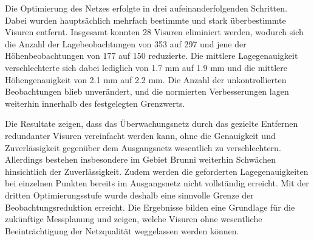 Die Optimierung des Netzes erfolgte in drei aufeinanderfolgenden Schritten.
Dabei wurden hauptsächlich mehrfach bestimmte und stark überbestimmte Visuren
entfernt. Insgesamt konnten 28 Visuren eliminiert werden, wodurch sich die
Anzahl der Lagebeobachtungen von 353 auf 297 und jene der Höhenbeobachtungen
von 177 auf 150 reduzierte. Die mittlere Lagegenauigkeit verschlechterte
sich dabei lediglich von 1.7 mm auf 1.9 mm und die mittlere Höhengenauigkeit
von 2.1 mm auf 2.2 mm. Die Anzahl der unkontrollierten Beobachtungen blieb
unverändert, und die normierten Verbesserungen lagen weiterhin innerhalb des
festgelegten Grenzwerts. \bigskip

Die Resultate zeigen, dass das Überwachungsnetz durch das gezielte Entfernen
redundanter Visuren vereinfacht werden kann, ohne die Genauigkeit und
Zuverlässigkeit gegenüber dem Ausgangsnetz wesentlich zu verschlechtern.
Allerdings bestehen insbesondere im Gebiet Brunni weiterhin Schwächen
hinsichtlich der Zuverlässigkeit. Zudem werden die geforderten
Lagegenauigkeiten bei einzelnen Punkten bereits im Ausgangsnetz nicht
vollständig erreicht. Mit der dritten Optimierungsstufe wurde deshalb eine
sinnvolle Grenze der Beobachtungsreduktion erreicht. Die Ergebnisse bilden
eine Grundlage für die zukünftige Messplanung und zeigen, welche Visuren
ohne wesentliche Beeinträchtigung der Netzqualität weggelassen werden können.

